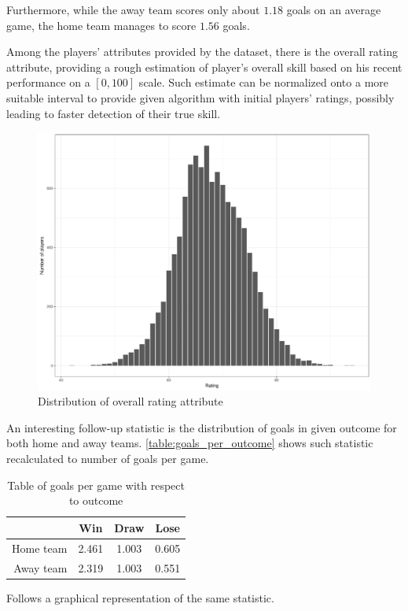 Furthermore, while the away team scores only about $1.18$ goals on an average game, the home team manages to score $1.56$ goals.

Among the players' attributes provided by the dataset, there is the overall rating attribute, providing a rough estimation of player's overall skill based on his recent performance on a $[0, 100]$ scale. Such estimate can be normalized onto a more suitable interval to provide given algorithm with initial players' ratings, possibly leading to faster detection of their true skill.

\begin{figure}[H]
\centering
\includegraphics[width=.8\linewidth]{figs/overall_rating_distribution}
\caption{Distribution of overall rating attribute}
\end{figure}

An interesting follow-up statistic is the distribution of goals in given outcome for both home and away teams. \autoref{table:goals_per_outcome} shows such statistic recalculated to number of goals per game.

\begin{table}[H]
\caption{Table of goals per game with respect to outcome}
\label{table:goals_per_outcome}
\centering
\begin{tabular}{| r | c | c | c |}
\hline
& Win & Draw & Lose \\ \hline
Home team & 2.461 & 1.003 & 0.605 \\ \hline
Away team & 2.319 & 1.003 &  0.551 \\ \hline
\end{tabular}
\end{table}

Follows a graphical representation of the same statistic.

